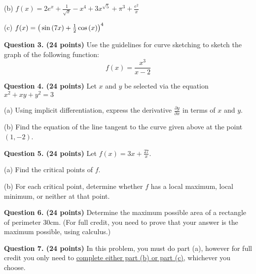 \documentclass[11pt]{article}
\begin{document}
\vspace{6.5cm}

(b) $f(x) = 2e^x + \frac{1}{\sqrt{x}} - x^4 + 3x^{\sqrt{5}} + 
\pi^3 + \frac{e^2}{x}$

\vspace{6.5cm}

(c) $f(x) = \big{(}\sin{(7x)} + \frac{1}{2}\cos{(x)}\big{)}^{4}$

\newpage

\textbf{\large Question 3. (24 points)}
Use the guidelines for curve sketching to sketch the graph of the
following function: 
\newline
$$
f(x) = \frac{x^3}{x-2}
$$

\vspace{6.5cm}

\textbf{\large Question 4. (24 points)}
Let $x$ and $y$ be selected via the equation $x^2+xy+y^2=3$

(a) Using implicit differentiation, express the derivative 
$\frac{\partial y}{\partial x}$ in terms of $x$ and $y$.

\vspace{6.5cm}

(b) Find the equation of the line tangent to the curve given above 
at the point $(1,-2)$.

\newpage

\textbf{\large Question 5. (24 points)} 
Let $f(x) = 3x + \frac{27}{x}$. 

(a) Find the critical points of $f$.

\vspace{6.5cm}

(b) For each critical point, determine whether $f$ has a local maximum,
local minimum, or neither at that point. 

\newpage 

\textbf{\large Question 6. (24 points)} 
Determine the maximum possible area of a rectangle of perimeter 30cm. 
(For full credit, you need to prove that your answer is the maximum
possible, using calculus.)


\newpage
\textbf{\large Question 7. (24 points)}
In this problem, you must do part (a), however for full credit you
only need to \underline{complete either part (b) or part (c)}, whichever you 
choose.
\end{document}
